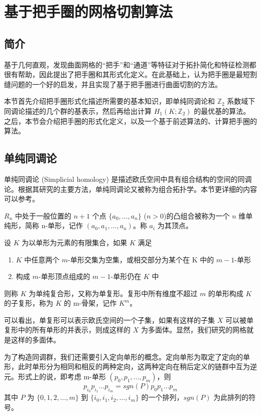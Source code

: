 
\chapter{基于把手圈的网格切割算法}

\section{简介}

\citet{oncomputinghantun} 基于几何直观，发现曲面网格的“把手”和“通道”等特征对于拓扑简化和特征检测都很有帮助，因此提出了把手圈和其形式化定义。在此基础上，\citet{Chai2018}认为把手圈是最短割缝问题的一个好的启发，并且实现了基于把手圈进行曲面切割的方法。

本节首先介绍把手圈形式化描述所需要的基本知识，即单纯同调论和 $ \mathbb{Z}_2 $ 系数域下同调论描述的几个群的基表示，然后再给出计算 $ H_1(K; \mathbb{Z}_2) $ 的最优基的算法。之后，本节会介绍把手圈的形式化定义，以及一个基于前述算法的、计算把手圈的算法。

\section{单纯同调论}

单纯同调论 (Simplicial homology) 是描述欧氏空间中具有组合结构的空间的同调论。根据其研究的主要方法，单纯同调论又被称为组合拓扑学。本节更详细的内容可以参考\cite{jctpxjy}。

$ R_n $ 中处于一般位置的 $ n + 1 $ 个点 $ \{a_0, \dots, a_n\} $ ($n > 0$)的凸组合被称为一个 $ n $ 维单纯形，简称 n-单形，记作 $ (a_0, a_1, \dots, a_n) $。称 $ a_i$ 为其顶点。

设 $ K $ 为以单形为元素的有限集合，如果 $ K $ 满足
\begin{enumerate}
    \item $ K $ 中任意两个 $m$-单形交集为空集，或相交部分为某个在 K 中的 $m-1$-单形
    \item 构成 $ m$-单形顶点组成的 $ m - 1 $-单形仍在 $ K $ 中
\end{enumerate}
则称 $ K $ 为单纯复合形，又称为单复形。复形中所有维度不超过 $ m $ 的单形构成 $ K $ 的子复形，称为 $ K $ 的 m-骨架，记作 $ K^m $。

可以看出，单复形可以表示欧氏空间的一个子集，如果有这样的子集 $ X $ 可以被单复形中的所有单形的并表示，则成这样的 $ X $ 为多面体。显然，我们研究的网格就是这样的多面体。

为了构造同调群，我们还需要引入定向单形的概念。定向单形为取定了定向的单形，此时单形分为相同和相反的两种定向，这两种定向在稍后定义的链群中互为逆元。形式上的说，即考虑 m-单形 $ (p_0, p_1, \dots, p_m) $，则 
$$ p_{i_0} p_{i_1} \dots p_{i_m} = sgn(P) p_{0} p_{1} \dots p_{m} $$
其中 $ P $ 为 $ \{0, 1, 2, \dots, m \} $ 到 $ \{i_0, i_1, i_2, \dots, i_m \} $ 的一个排列，$ sgn(P) $ 为此排列的符号。

